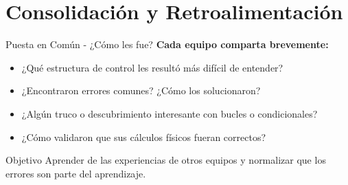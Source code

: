 \documentclass[10pt]{beamer}
\begin{document}
\section{Consolidación y Retroalimentación}

\begin{frame}{Puesta en Común - ¿Cómo les fue?}
  \textbf{Cada equipo comparta brevemente:}
  \begin{itemize}
    \item ¿Qué estructura de control les resultó más difícil de entender?
    \item ¿Encontraron errores comunes? ¿Cómo los solucionaron?
    \item ¿Algún truco o descubrimiento interesante con bucles o condicionales?
    \item ¿Cómo validaron que sus cálculos físicos fueran correctos?
  \end{itemize}
  
  \begin{alertblock}{Objetivo}
    Aprender de las experiencias de otros equipos y normalizar que los errores son parte del aprendizaje.
  \end{alertblock}
\end{frame}
\end{document}
